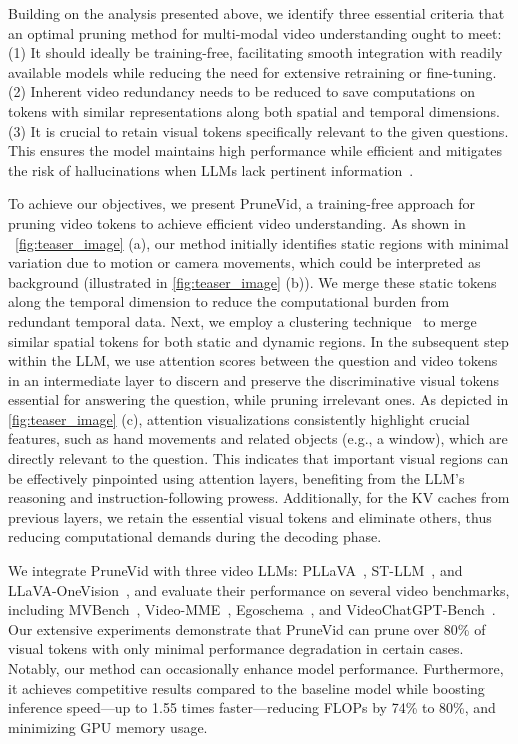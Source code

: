 \documentclass{article} %
\begin{document}
Building on the analysis presented above, we identify three essential criteria that an optimal pruning method for multi-modal video understanding ought to meet: (1) It should ideally be training-free, facilitating smooth integration with readily available models while reducing the need for extensive retraining or fine-tuning. (2) Inherent video redundancy needs to be reduced to save computations on tokens with similar representations along both spatial and temporal dimensions. (3) It is crucial to retain visual tokens specifically relevant to the given questions. This ensures the model maintains high performance while efficient and mitigates the risk of hallucinations when LLMs lack pertinent information~\citep{visualhallucination}.

To achieve our objectives, we present PruneVid, a training-free approach for pruning video tokens to achieve efficient video understanding. As shown in ~\cref{fig:teaser_image} (a), our method initially identifies static regions with minimal variation due to motion or camera movements, which could be interpreted as background (illustrated in \cref{fig:teaser_image} (b)). We merge these static tokens along the temporal dimension to reduce the computational burden from redundant temporal data. Next, we employ a clustering technique~\citep{DPC-KNN} to merge similar spatial tokens for both static and dynamic regions. In the subsequent step within the LLM, we use attention scores between the question and video tokens in an intermediate layer to discern and preserve the discriminative visual tokens essential for answering the question, while pruning irrelevant ones. As depicted in \cref{fig:teaser_image} (c), attention visualizations consistently highlight crucial features, such as hand movements and related objects (e.g., a window), which are directly relevant to the question. This indicates that important visual regions can be effectively pinpointed using attention layers, benefiting from the LLM’s reasoning and instruction-following prowess. Additionally, for the KV caches from previous layers, we retain the essential visual tokens and eliminate others, thus reducing computational demands during the decoding phase.

We integrate PruneVid with three video LLMs: PLLaVA~\citep{pllava}, ST-LLM~\citep{stllm}, and LLaVA-OneVision~\citep{llava-onevision}, and evaluate their performance on several video benchmarks, including MVBench~\citep{videochat2}, Video-MME~\citep{videomme}, Egoschema~\citep{egoschema}, and VideoChatGPT-Bench~\citep{videochatgpt}. Our extensive experiments demonstrate that PruneVid can prune over 80\% of visual tokens with only minimal performance degradation in certain cases. Notably, our method can occasionally enhance model performance. Furthermore, it achieves competitive results compared to the baseline model while boosting inference speed—up to 1.55 times faster—reducing FLOPs by 74\% to 80\%, and minimizing GPU memory usage.
\end{document}
